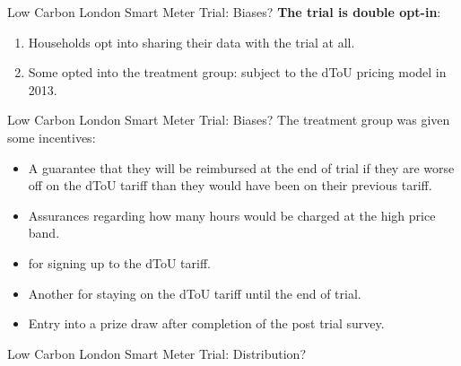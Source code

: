 \documentclass{beamer}
\begin{document}
\begin{frame}{Low Carbon London Smart Meter Trial: Biases?}
  \textbf{The trial is double opt-in}:
  \begin{enumerate}
    \item Households opt into sharing their data with the trial at all.
    \item Some opted into the treatment group: subject to the dToU pricing model in 2013.
  \end{enumerate}
\end{frame}

\begin{frame}{Low Carbon London Smart Meter Trial: Biases?}
  The treatment group was given some incentives: 
  \begin{itemize}
    \item A guarantee that they will be reimbursed at the end of trial if they are worse off on the dToU tariff than they would have been on their previous tariff.
    \item Assurances regarding how many hours would be charged at the high price band.
    \item {} for signing up to the dToU tariff.
    \item Another  for staying on the dToU tariff until the end of trial.
    \item Entry into a prize draw after completion of the post trial survey.
  \end{itemize}
\end{frame}

\begin{frame}{Low Carbon London Smart Meter Trial: Distribution?}
  \begin{figure}
    \centering
    \qquad
  \end{figure}
\end{frame}
\end{document}
